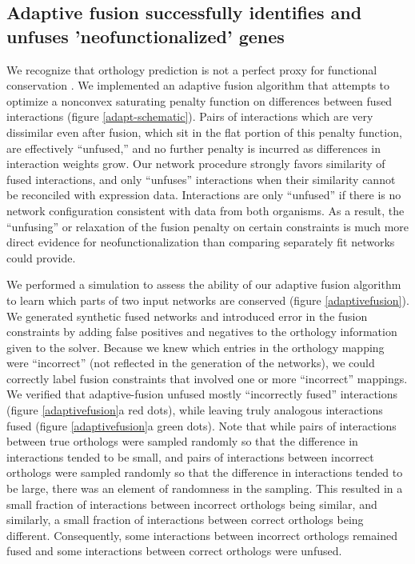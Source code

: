 \documentclass[11pt]{article}
\begin{document}
\subsection{Adaptive fusion successfully identifies and unfuses 'neofunctionalized' genes}
We recognize that orthology prediction is not a perfect proxy for functional conservation \cite{gabaldon_functional_2013, studer_how_2009, nehrt_testing_2011}. We implemented an adaptive fusion algorithm that attempts to optimize a nonconvex saturating penalty function on differences between fused interactions (figure \ref{adapt-schematic}). Pairs of interactions which are very dissimilar even after fusion, which sit in the flat portion of this penalty function, are effectively ``unfused,'' and no further penalty is incurred as differences in interaction weights grow. Our network procedure strongly favors similarity of fused interactions, and only ``unfuses'' interactions when their similarity cannot be reconciled with expression data. Interactions are only ``unfused'' if there is no network configuration consistent with data from both organisms. As a result, the ``unfusing'' or relaxation of the fusion penalty on certain constraints is much more direct evidence for neofunctionalization than comparing separately fit networks could provide. 

We performed a simulation to assess the ability of our adaptive fusion algorithm to learn which parts of two input networks are conserved (figure \ref{adaptivefusion}). We generated synthetic fused networks and introduced error in the fusion constraints by adding false positives and negatives to the orthology information given to the solver. Because we knew which entries in the orthology mapping were ``incorrect'' (not reflected in the generation of the networks), we could correctly label fusion constraints that involved one or more ``incorrect'' mappings. We verified that adaptive-fusion unfused mostly ``incorrectly fused'' interactions (figure \ref{adaptivefusion}a red dots), while leaving truly analogous interactions fused (figure \ref{adaptivefusion}a green dots). Note that while pairs of interactions between true orthologs were sampled randomly so that the difference in interactions tended to be small, and pairs of interactions between incorrect orthologs were sampled randomly so that the difference in interactions tended to be large, there was an element of randomness in the sampling. This resulted in a small fraction of interactions between incorrect orthologs being similar, and similarly, a small fraction of interactions between correct orthologs being different. Consequently, some interactions between incorrect orthologs remained fused and some interactions between correct orthologs were unfused. 
\end{document}
